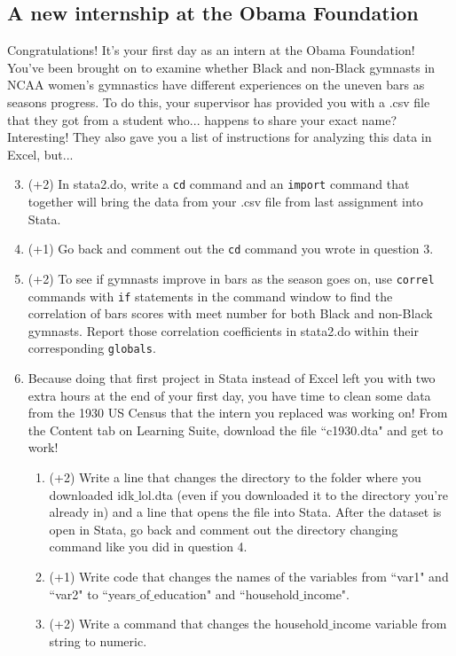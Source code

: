 \documentclass[12pt, oneside]{article}
\begin{document}
\subsection{A new internship at the Obama Foundation}
\item Congratulations! It's your first day as an intern at the Obama Foundation! You've been brought on to examine whether Black and non-Black gymnasts in NCAA women's gymnastics have different experiences on the uneven bars as seasons progress. To do this, your supervisor has provided you with a .csv file that they got from a student who... happens to share your exact name? Interesting! They also gave you a list of instructions for analyzing this data in Excel, but...
\begin{enumerate}
\setcounter{enumi}{2}
\item   (+2)    In stata2.do, write a \texttt{cd} command and an \texttt{import} command that together will bring the data from your .csv file from last assignment into Stata.
\item   (+1)    Go back and comment out the \texttt{cd} command you wrote in question 3. 
\item   (+2)    To see if gymnasts improve in bars as the season goes on, use \texttt{correl} commands with \texttt{if} statements in the command window to find the correlation of bars scores with meet number for both Black and non-Black gymnasts. Report those correlation coefficients in stata2.do within their corresponding \texttt{globals}.
\item Because doing that first project in Stata instead of Excel left you with two extra hours at the end of your first day, you have time to clean some data from the 1930 US Census that the intern you replaced was working on! From the Content tab on Learning Suite, download the file ``c1930.dta" and get to work!
\begin{enumerate}
    \item (+2) Write a line that changes the directory to the folder where you downloaded idk$\_$lol.dta (even if you downloaded it to the directory you're already in) and a line that opens the file into Stata. After the dataset is open in Stata, go back and comment out the directory changing command like you did in question 4.
    \item (+1) Write code that changes the names of the variables from ``var1" and ``var2" to ``years$\_$of$\_$education" and ``household$\_$income".
    \item (+2) Write a command that changes the household$\_$income variable from string to numeric.

\end{enumerate}
\end{enumerate}
\end{document}
